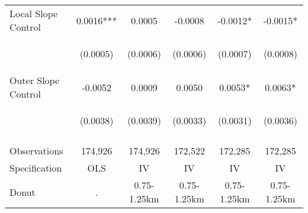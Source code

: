 \begin{tabular}{lccccc}
Local Slope Control & 0.0016*** & 0.0005 & -0.0008 & -0.0012* & -0.0015* \\
\vspace{4pt} & \begin{footnotesize}(0.0005)\end{footnotesize} & \begin{footnotesize}(0.0006)\end{footnotesize} & \begin{footnotesize}(0.0006)\end{footnotesize} & \begin{footnotesize}(0.0007)\end{footnotesize} & \begin{footnotesize}(0.0008)\end{footnotesize} \\
Outer Slope Control & -0.0052 & 0.0009 & 0.0050 & 0.0053* & 0.0063* \\
 & \begin{footnotesize}(0.0038)\end{footnotesize} & \begin{footnotesize}(0.0039)\end{footnotesize} & \begin{footnotesize}(0.0033)\end{footnotesize} & \begin{footnotesize}(0.0031)\end{footnotesize} & \begin{footnotesize}(0.0036)\end{footnotesize} \\
\vspace{4pt} & \begin{footnotesize}\end{footnotesize} & \begin{footnotesize}\end{footnotesize} & \begin{footnotesize}\end{footnotesize} & \begin{footnotesize}\end{footnotesize} & \begin{footnotesize}\end{footnotesize} \\
Observations & 174,926 & 174,926 & 172,522 & 172,285 & 172,285 \\
Specification & OLS & IV & IV & IV & IV \\
Donut & . & 0.75-1.25km & 0.75-1.25km & 0.75-1.25km & 0.75-1.25km \\

\end{tabular}
